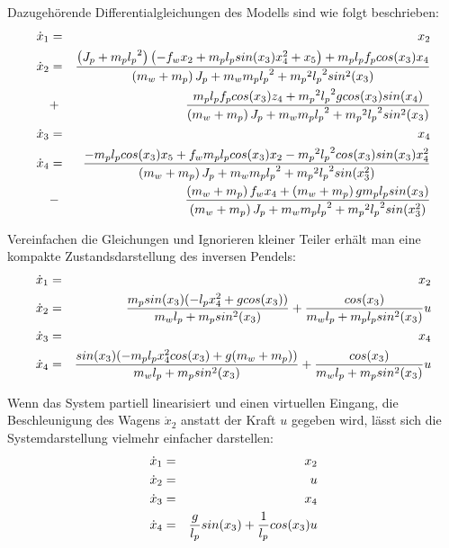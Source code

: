 \begin{beispiel}
	Dazugehörende Differentialgleichungen des Modells sind wie folgt beschrieben\cite{TUM}\cite{MAMoh}:
	\begin{eqnarray}
	\dot{x}_{1}&=&x_{2}\notag\\
	\dot{x}_{2}&=&\frac{\left ( J_{p}+m_{p}{l_{p}}^{2} \right )\left ( -f_{w}x_{2}+m_{p}l_{p}sin(x_{3})x_{4}^{2}+x_{5}\right )+m_{p}l_{p}f_{p}cos(x_{3})x_{4}}{\left ( m_{w}+m_{p} \right )J_{p}+m_{w}m_{p}{l_{p}}^{2}+{m_{p}}^{2}{l_{p}}^{2}sin^{2}(x_{3})}\notag\\&+&\frac{m_{p}l_{p}f_{p}cos(x_{3})z_{4}+{m_{p}}^{2}{l_{p}}^{2}gcos(x_{3})sin(x_{4})}{\left ( m_{w}+m_{p} \right )J_{p}+m_{w}m_{p}{l_{p}}^{2}+{m_{p}}^{2}{l_{p}}^{2}sin^{2}(x_{3})}\notag
	\\
	\dot{x}_{3}&=&x_{4}\notag\\
	\dot{x}_{4}&=&\frac{-m_{p}l_{p}cos(x_{3})x_{5}+f_{w}m_{p}l_{p}cos(x_{3})x_{2}- {m_{p}}^{2}{l_{p}}^{2}cos(x_{3})sin(x_{3})x_{4}^{2}}{\left ( m_{w}+m_{p} \right )J_{p}+m_{w}m_{p}{l_{p}}^{2}+{m_{p}}^{2}{l_{p}}^{2}sin(x_{3}^{2})}\notag\\&-&\frac{\left ( m_{w}+m_{p} \right )f_{w}x_{4}+\left ( m_{w}+m_{p} \right )gm_{p}l_{p}sin(x_{3})}{\left ( m_{w}+m_{p} \right )J_{p}+m_{w}m_{p}{l_{p}}^{2}+{m_{p}}^{2}{l_{p}}^{2}sin(x_{3}^{2})}\label{eq:DLG_Inverses_Pendel}  
	\end{eqnarray}
	
	Vereinfachen die Gleichungen und Ignorieren kleiner Teiler erhält man eine kompakte Zustandsdarstellung des inversen Pendels\cite{kunze2016pytrajectory}:
	\begin{eqnarray}
	\dot{x}_{1}&=&x_{2}\notag\\
	\dot{x}_{2}&=&\frac{m_{p}sin(x_{3})(-l_{p}x_{4}^{2}+gcos(x_{3}))}{m_{w}l_{p}+m_{p}sin^{2}(x_{3})}+\frac{cos(x_{3})}{m_{w}l_{p}+m_{p}l_{p}sin^{2}(x_{3})}u\notag\\
	\dot{x}_{3}&=&x_{4}\notag\\
	\dot{x}_{4}&=&\frac{sin(x_{3})(-m_{p}l_{p}x_{4}^{2}cos(x_{3})+g(m_{w}+m_{p}))}{m_{w}l_{p}+m_{p}sin^{2}(x_{3})}+\frac{cos(x_{3})}{m_{w}l_{p}+m_{p}sin^{2}(x_{3})}u\label{eq:DLG_Inverses_Pendel_compact}   
	\end{eqnarray}
	
	Wenn das System partiell linearisiert und einen virtuellen Eingang, die Beschleunigung des Wagens $\dot{x}_{2}$ anstatt der Kraft $u$ gegeben wird, lässt sich die Systemdarstellung vielmehr einfacher darstellen:
	\begin{eqnarray}
	\dot{x}_{1}&=&x_{2}\notag\\
	\dot{x}_{2}&=&u\notag\\
	\dot{x}_{3}&=&x_{4}\notag\\
	\dot{x}_{4}&=&\frac{g}{l_{p}}sin(x_{3})+\frac{1}{l_{p}}cos(x_{3})u\label{eq:DLG_Inverses_Pendel_partiell_lin}   
	\end{eqnarray}
	

\end{beispiel}

